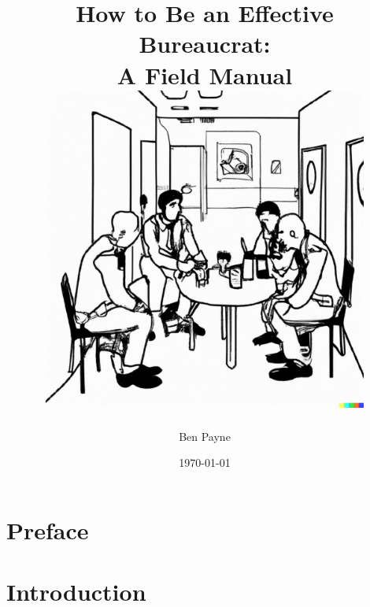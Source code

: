 \documentclass{book}
\title{How to Be an Effective Bureaucrat:\\
A Field Manual\\
\vfill
\includegraphics[width=0.8\textwidth]{images/bureaucrat_empathizing_with_coworkers_in_office_breakroom.pdf}
}
\author{Ben Payne}
\date{\today}
\begin{document}





\begin{titlepage}
\maketitle
\thispagestyle{empty}
\end{titlepage}
\clearpage

\frontmatter %

\clearpage

\dominitoc %
\hypertarget{contents}{}
\tableofcontents

\chapter{Preface}
\clearpage

\mainmatter %



\newif\ifpageref
\newif\ifsectionref
\pagereffalse
\sectionreffalse

\newtoggle{pageref}
\newtoggle{sectionref}

\togglefalse{pageref}
\togglefalse{sectionref}



\chapter{Introduction\label{sec:introduction}}
\minitoc
  
\end{document}
